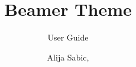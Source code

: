 \documentclass[aspectratio=169]{beamer}
\title[Theme User Guide]{Beamer Theme \glsentrytext{uastw}}
\subtitle{User Guide}
\author{Alija Sabic, \glsentrytext{msc}}
\institute{Department Electronic Engineering}
\begin{document}
\begin{frame}[plain]
    \titlepage
\end{frame}
\end{document}
